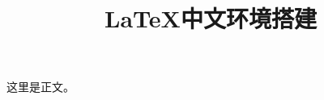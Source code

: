 \documentclass[a4paper, 11pt，UTF8]{ctexart}
\title{LaTeX中文环境搭建}
\begin{document}
	\maketitle
	这里是正文。
\end{document}
